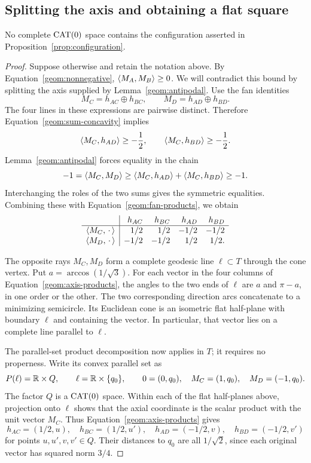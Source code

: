 \subsection{Splitting the axis and obtaining a flat square}

\begin{proposition}
\label{prop:no-configuration}
No complete $\operatorname{CAT}(0)$ space contains the configuration asserted in
Proposition~\ref{prop:configuration}.
\end{proposition}

\begin{proof}
Suppose otherwise and retain the notation above.  By
Equation~\eqref{geom:nonnegative}, $\langle M_A,M_B\rangle\geq0$.
We will contradict this bound by splitting the axis supplied by
Lemma~\ref{geom:antipodal}.  Use the fan identities
\[
 M_C=h_{AC}\oplus h_{BC},\qquad
 M_D=h_{AD}\oplus h_{BD}.
\]
The four lines in these expressions are pairwise distinct.  Therefore
Equation~\eqref{geom:sum-concavity} implies
\[
 \langle M_C,h_{AD}\rangle\geq-\frac12,
 \qquad \langle M_C,h_{BD}\rangle\geq-\frac12.
\]
Lemma~\ref{geom:antipodal} forces equality in the chain
\[
 -1=\langle M_C,M_D\rangle
 \geq\langle M_C,h_{AD}\rangle+\langle M_C,h_{BD}\rangle\geq-1.
\]
Interchanging the roles of the two sums gives the symmetric
equalities.  Combining these with
Equation~\eqref{geom:fan-products}, we obtain
\begin{equation}
\begin{array}{c|rrrr}
 &h_{AC}&h_{BC}&h_{AD}&h_{BD}\\ \hline
 \langle M_C,\,\cdot\,\rangle& 1/2&1/2&-1/2&-1/2\\
 \langle M_D,\,\cdot\,\rangle&-1/2&-1/2& 1/2& 1/2.
\end{array}
\label{geom:axis-products}
\end{equation}

The opposite rays $M_C,M_D$ form a complete geodesic line
$\ell\subset T$ through the cone vertex.  Put
$a=\arccos(1/\sqrt3)$.  For each vector in the
four columns of Equation~\eqref{geom:axis-products}, the angles to
the two ends of $\ell$ are $a$ and $\pi-a$, in one order or the
other.  The two corresponding direction arcs concatenate to a
minimizing semicircle.  Its Euclidean cone is an isometric flat
half-plane with boundary $\ell$ and containing the vector.  In
particular, that vector lies on a complete line parallel to $\ell$.

The parallel-set product decomposition
\cite[Theorem~II.2.14]{BH1999} now applies in $T$; it requires no
properness.  Write its convex parallel set as
\[
 P(\ell)=\mathbb R\times Q,\qquad
 \ell=\mathbb R\times\{q_0\},\qquad
 0=(0,q_0),\quad M_C=(1,q_0),\quad M_D=(-1,q_0).
\]
The factor $Q$ is a $\operatorname{CAT}(0)$ space.  Within each of the flat
half-planes above, projection onto $\ell$ shows that the axial
coordinate is the scalar product with the unit vector $M_C$.
Thus Equation~\eqref{geom:axis-products} gives
\begin{equation}
 h_{AC}=(1/2,u),\quad h_{BC}=(1/2,u'),\quad
 h_{AD}=(-1/2,v),\quad h_{BD}=(-1/2,v')
 \label{geom:split-coordinates}
\end{equation}
for points $u,u',v,v'\in Q$.  Their distances to $q_0$ are all
$1/\sqrt2$, since each original vector has squared norm $3/4$.


\end{proof}
